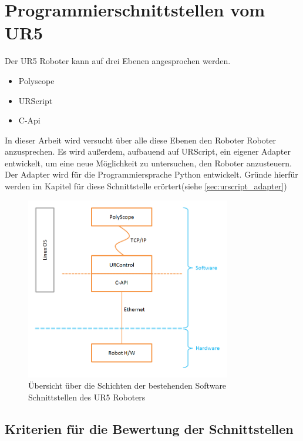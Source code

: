 \section{Programmierschnittstellen vom UR5}
\label{sec:programm_api_uebersicht_gru}

Der UR5 Roboter kann auf drei Ebenen angesprochen werden.\\

\begin{itemize}
\item Polyscope
\item URScript
\item C-Api
\end{itemize}

In dieser Arbeit wird versucht über alle diese Ebenen den Roboter Roboter anzusprechen.
Es wird außerdem, aufbauend auf URScript, ein eigener Adapter entwickelt, um eine neue Möglichkeit zu untersuchen, den Roboter anzusteuern.
Der Adapter wird für die Programmiersprache Python entwickelt. Gründe hierfür werden im Kapitel für diese Schnittstelle erörtert(siehe \ref{sec:urscript_adapter})

\begin{figure}[H]
  \centering
    \includegraphics[width=0.8\textwidth]{pic/ur_programming_levels.png}
      \caption[Schichten der Software Schnittstellen]{Übersicht über die
      Schichten der bestehenden Software Schnittstellen des UR5 Roboters}
      \label{fig:schnittstellen_schichten}
\end{figure}

\subsection{Kriterien für die Bewertung der Schnittstellen}
\label{sub:criterias_of_solutions_kon}

